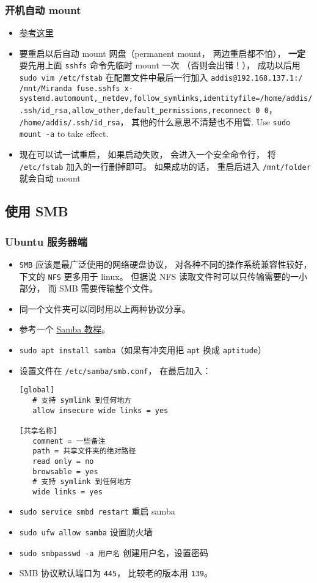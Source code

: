 \subsubsection{开机自动 mount}
\begin{itemize}
\item \href{https://www.linode.com/docs/networking/ssh/using-sshfs-on-linux/}{参考这里}
\item 要重启以后自动 mount 网盘（permanent mount， 两边重启都不怕）， \textbf{一定}要先用上面 \verb`sshfs` 命令先临时 mount 一次 （否则会出错！）， 成功以后用 \verb`sudo vim /etc/fstab` 在配置文件中最后一行加入 \verb`addis@192.168.137.1:/ /mnt/Miranda fuse.sshfs x-systemd.automount,_netdev,follow_symlinks,identityfile=/home/addis/.ssh/id_rsa,allow_other,default_permissions,reconnect 0 0`， \verb`/home/addis/.ssh/id_rsa`， 其他的什么意思不清楚也不用管. Use \verb`sudo mount -a` to take effect.
\item 现在可以试一试重启， 如果启动失败， 会进入一个安全命令行， 将 \verb`/etc/fstab` 加入的一行删掉即可。 如果成功的话， 重启后进入 \verb`/mnt/folder` 就会自动 mount
\end{itemize}

\subsection{使用 SMB}
\subsubsection{Ubuntu 服务器端}
\begin{itemize}
\item \verb|SMB| 应该是最广泛使用的网络硬盘协议， 对各种不同的操作系统兼容性较好， 下文的 \verb|NFS| 更多用于 linux。 但据说 NFS 读取文件时可以只传输需要的一小部分， 而 SMB 需要传输整个文件。
\item 同一个文件夹可以同时用以上两种协议分享。
\item 参考一个 \href{https://ubuntu.com/tutorials/install-and-configure-samba}{Samba 教程}。
\item \verb|sudo apt install samba|（如果有冲突用把 \verb|apt| 换成 \verb|aptitude|）
\item 设置文件在 \verb|/etc/samba/smb.conf|， 在最后加入：
\begin{lstlisting}[language=none]
[global]
   # 支持 symlink 到任何地方
   allow insecure wide links = yes

[共享名称]
   comment = 一些备注
   path = 共享文件夹的绝对路径
   read only = no
   browsable = yes
   # 支持 symlink 到任何地方
   wide links = yes
\end{lstlisting}
\item \verb|sudo service smbd restart| 重启 samba
\item \verb|sudo ufw allow samba| 设置防火墙
\item \verb|sudo smbpasswd -a 用户名| 创建用户名，设置密码
\item SMB 协议默认端口为 \verb|445|， 比较老的版本用 \verb|139|。
\end{itemize}


